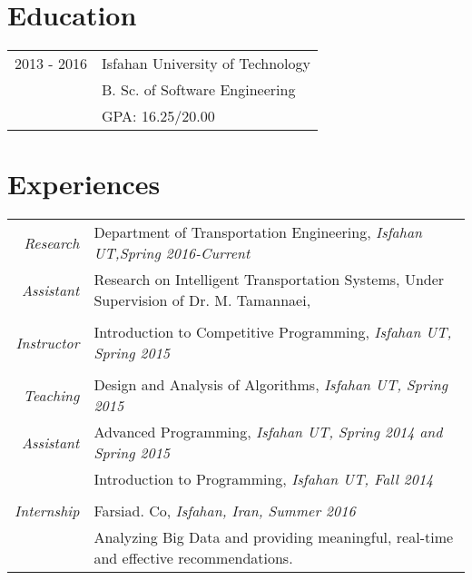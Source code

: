 \documentclass[a4paper,10pt]{article}
\begin{document}
	\section{Education}
		\begin{tabular}{rl}	
			{2013 - 2016} & {Isfahan University of Technology}\\
						   & {\small B. Sc. of Software Engineering} \\
					       & {\small GPA: 16.25/20.00}
		\end{tabular}
	
	\section{Experiences}
		\begin{tabular}{r|p{11cm}}
			\emph{Research} & Department of Transportation Engineering, \emph{\color{darkgray}\small Isfahan UT,\space\space Spring 2016-Current} \\
			\emph{Assistant}&\footnotesize{Research on Intelligent Transportation Systems, Under Supervision of Dr. M. Tamannaei,}\\
			\multicolumn{2}{c}{} \\
			\emph{Instructor} & Introduction to Competitive Programming, \emph{\color{darkgray}\small Isfahan UT, Spring 2015}\\
			\multicolumn{2}{c}{} \\
			\emph{Teaching} & Design and Analysis of Algorithms, \emph{\color{darkgray}\small Isfahan UT, Spring 2015} \vspace{1 mm}\\
			\emph{Assistant}& Advanced Programming, \emph{\color{darkgray}\small Isfahan UT, Spring 2014 and Spring 2015}\vspace{1 mm}\\
							& Introduction to Programming, \emph{\color{darkgray}\small Isfahan UT, Fall 2014}\\
			\multicolumn{2}{c}{} \\
			\emph{Internship} & Farsiad. Co, \emph{\color{darkgray}\small Isfahan, Iran, Summer 2016}\\
			&\footnotesize{Analyzing Big Data and providing meaningful, real-time and effective recommendations.}\\
		\end{tabular}
	
\end{document}
